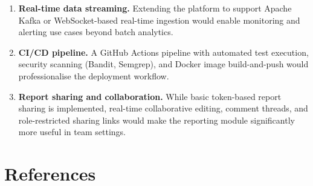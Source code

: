 \documentclass[12pt,a4paper]{report}
\begin{document}
\begin{enumerate}[leftmargin=2em]
    \item \textbf{Real-time data streaming.} Extending the platform to support Apache Kafka or WebSocket-based real-time ingestion would enable monitoring and alerting use cases beyond batch analytics.

    \item \textbf{CI/CD pipeline.} A GitHub Actions pipeline with automated test execution, security scanning (Bandit, Semgrep), and Docker image build-and-push would professionalise the deployment workflow.

    \item \textbf{Report sharing and collaboration.} While basic token-based report sharing is implemented, real-time collaborative editing, comment threads, and role-restricted sharing links would make the reporting module significantly more useful in team settings.

\end{enumerate}

\chapter*{References}
\end{document}
